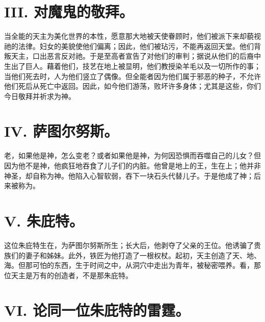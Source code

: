 
\section{III. 对魔鬼的敬拜。}

当全能的天主为美化世界的本性，愿意那大地被天使眷顾时，他们被派下来却藐视祂的法律。妇女的美貌使他们偏离；因此，他们被玷污，不能再返回天堂。他们背叛天主，口出恶言反对祂。于是至高者宣告了对他们的审判；据说从他们的后裔中生出了巨人。藉着他们，技艺在地上被显明，他们教授染羊毛以及一切所作的事；当他们死去时，人为他们竖立了偶像。但全能者因为他们属于邪恶的种子，不允许他们死后从死亡中返回。因此，如今他们游荡，败坏许多身体；尤其是这些，你们今日敬拜并祈求为神。\par


\section{IV. 萨图尔努斯。}

老，如果他是神，怎么变老？或者如果他是神，为何因恐惧而吞噬自己的儿女？但因为他不是神，他疯狂地吞食了儿子们的内脏。他曾是地上的王，生在上；他并非神圣，却自称为神。他陷入心智软弱，吞下一块石头代替儿子。于是他成了神；后来被称为。\par


\section{V. 朱庇特。}

这位朱庇特生在，为萨图尔努斯所生；长大后，他剥夺了父亲的王位。他诱骗了贵族们的妻子和姊妹。此外，铁匠为他打造了一根权杖。起初，天主创造了天、地、海。但那可怕的东西，生于时间之中，从洞穴中走出为青年，被秘密喂养。看，那位天主是万有的创造者，不是那朱庇特。\par


\section{VI. 论同一位朱庇特的雷霆。}

